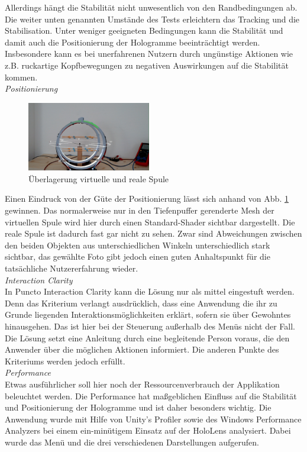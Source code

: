 Allerdings hängt die Stabilität nicht unwesentlich von den Randbedingungen ab. Die weiter unten genannten Umstände des Tests erleichtern das Tracking und die Stabilisation. Unter weniger geeigneten Bedingungen kann die Stabilität und damit auch die Positionierung der Hologramme beeinträchtigt werden. Insbesondere kann es bei unerfahrenen Nutzern durch ungünstige Aktionen wie z.B. ruckartige Kopfbewegungen zu negativen Auswirkungen auf die Stabilität kommen.\\

\textit{Positionierung}
\begin{figure}
	\centering
	\includegraphics[width=0.48\textwidth]{images/HL/model-overlay.jpg}
	\caption{Überlagerung virtuelle und reale Spule}
	\label{img:model-overlay}
\end{figure}
Einen Eindruck von der Güte der Positionierung lässt sich anhand von Abb. \ref{img:model-overlay} gewinnen. Das normalerweise nur in den Tiefenpuffer gerenderte Mesh der virtuellen Spule wird hier durch einen Standard-Shader sichtbar dargestellt. Die reale Spule ist dadurch fast gar nicht zu sehen. Zwar sind Abweichungen zwischen den beiden Objekten aus unterschiedlichen Winkeln unterschiedlich stark sichtbar, das gewählte Foto gibt jedoch einen guten Anhaltspunkt für die tatsächliche Nutzererfahrung wieder.\\

\textit{Interaction Clarity}\\
In Puncto Interaction Clarity kann die Lösung nur als mittel eingestuft werden. Denn das Kriterium verlangt ausdrücklich, dass eine Anwendung die ihr zu Grunde liegenden Interaktionsmöglichkeiten erklärt, sofern sie über Gewohntes hinausgehen. Das ist hier bei der Steuerung außerhalb des Menüs nicht der Fall. Die Lösung setzt eine Anleitung durch eine begleitende Person voraus, die den Anwender über die möglichen Aktionen informiert. Die anderen Punkte des Kriteriums werden jedoch erfüllt.\\

\textit{Performance}\\
Etwas ausführlicher soll hier noch der Ressourcenverbrauch der Applikation beleuchtet werden. Die Performance hat maßgeblichen Einfluss auf die Stabilität und Positionierung der Hologramme und ist daher besonders wichtig. Die Anwendung wurde mit Hilfe von Unity's Profiler sowie des Windows Performance Analyzers bei einem ein-minütigem Einsatz auf der HoloLens analysiert. Dabei wurde das Menü und die drei verschiedenen Darstellungen aufgerufen.

